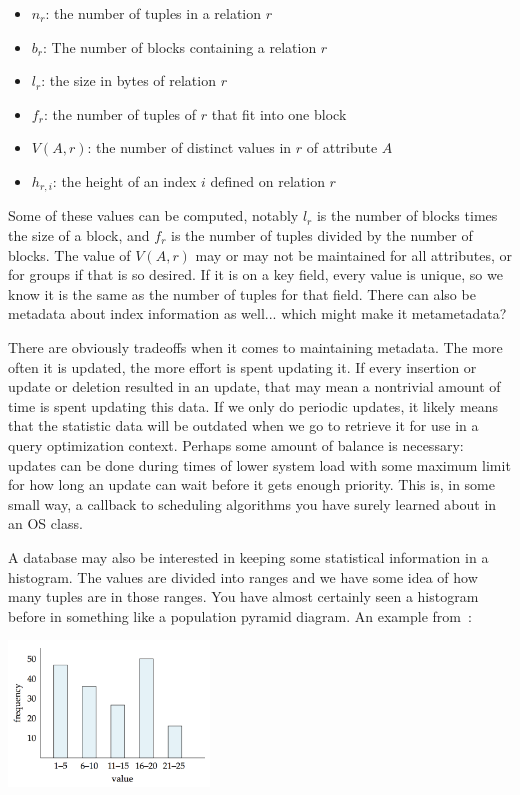 \begin{itemize}
	\item $n_{r}$: the number of tuples in a relation $r$ 
	\item $b_{r}$: The number of blocks containing a relation $r$ 
	\item $l_{r}$: the size in bytes of relation $r$
	\item $f_{r}$: the number of tuples of $r$ that fit into one block
	\item $V(A, r)$: the number of distinct values in $r$ of attribute $A$
	\item $h_{r, i}$: the height of an index $i$ defined on relation $r$
\end{itemize}

Some of these values can be computed, notably $l_{r}$ is the number of blocks times the size of a block, and $f_{r}$ is the number of tuples divided by the number of blocks. The value of $V(A, r)$ may or may not be maintained for all attributes, or for groups if that is so desired. If it is on a key field, every value is unique, so we know it is the same as the number of tuples for that field. There can also be metadata about index information as well... which might make it metametadata? 

There are obviously tradeoffs when it comes to maintaining metadata. The more often it is updated, the more effort is spent updating it. If every insertion or update or deletion resulted in an update, that may mean a nontrivial amount of time is spent updating this data. If we only do periodic updates, it likely means that the statistic data will be outdated when we go to retrieve it for use in a query optimization context. Perhaps some amount of balance is necessary: updates can be done during times of lower system load with some maximum limit for how long an update can wait before it gets enough priority. This is, in some small way, a callback to scheduling algorithms you have surely learned about in an OS class. 

A database may also be interested in keeping some statistical information in a histogram. The values are divided into ranges and we have some idea of how many tuples are in those ranges. You have almost certainly seen a histogram before in something like a population pyramid diagram. An example from~\cite{dsc}:

\begin{center}
\includegraphics[width=0.4\textwidth]{images/histogram}
\end{center}

